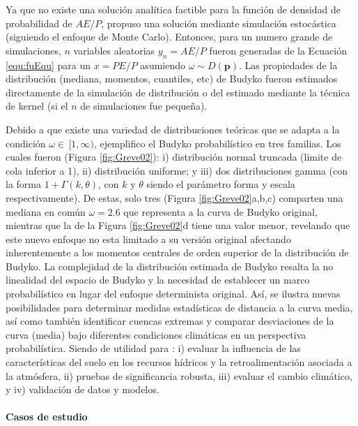 \documentclass[12pt]{article}
\begin{document}
Ya que no existe una solución analítica factible para la función de densidad de probabilidad de $AE/P$, \citet{Greve2015} propuso una solución mediante simulación estocástica (siguiendo el enfoque de Monte Carlo). Entonces, para un numero grande de simulaciones, $n$ variables aleatorias $y_{n} = AE/P$ fueron generadas de la Ecuación \ref{equ:fuEqu} para un $x = PE/P$ asumiendo $\omega \sim D(\textbf{p})$. Las propiedades de la distribución (mediana, momentos, cuantiles, etc) de Budyko fueron estimados directamente de la simulación de distribución o del estimado mediante la técnica de kernel (si el $n$ de simulaciones fue pequeña).

Debido a que existe una variedad de distribuciones teóricas que se adapta a la condición $\omega \in\,[1,\infty)$, \citet{Greve2015} ejemplifico el Budyko probabilístico en tres familias. Los cuales fueron (Figura \ref{fig:Greve02}): i) distribución normal truncada (limite de cola inferior a 1), ii) distribución uniforme; y iii) dos distribuciones gamma (con la forma $1 + \Gamma (k, \theta )$, con $k$ y $\theta$ siendo el parámetro forma y escala respectivamente). De estas, solo tres (Figura \ref{fig:Greve02}a,b,c) comparten una mediana en común $\omega = 2.6$ que representa a la curva de Budyko original, mientras que la de la Figura \ref{fig:Greve02}d tiene una valor menor, revelando que este nuevo enfoque no esta limitado a su versión original afectando inherentemente a los momentos centrales de orden superior de la distribución de Budyko. La complejidad de la distribución estimada de Budyko resalta la no linealidad del espacio de Budyko y la necesidad de establecer un marco probabilístico en lugar del enfoque determinista original. Así, se ilustra nuevas posibilidades para determinar medidas estadísticas de distancia a la curva media, así como también identificar cuencas extremas y comparar desviaciones de la curva (media) bajo diferentes condiciones climáticas en un perspectiva probabilística. Siendo de utilidad para : i) evaluar la influencia de las características del suelo en los recursos hídricos y la retroalimentación asociada a la atmósfera, ii) pruebas de significancia robusta, iii) evaluar el cambio climático, y iv) validación de datos y modelos.



\paragraph{Casos de estudio}\mbox{}
\end{document}

